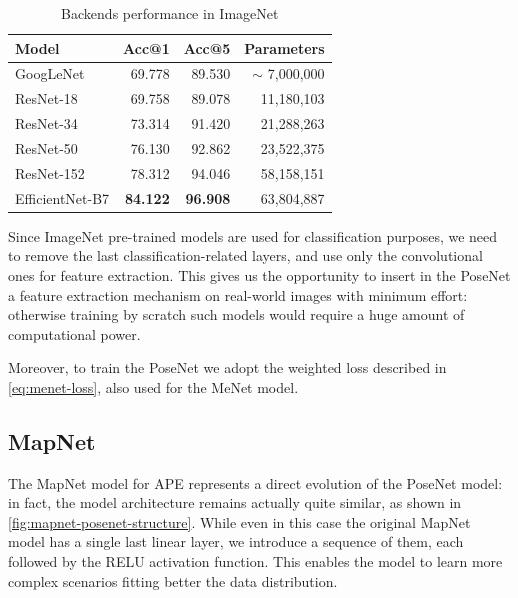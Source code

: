 \begin{table}[htbp]
    \caption{Backends performance in ImageNet}
    \begin{center}
        \begin{tabular}{lrrr}
            \toprule
            Model           & Acc@1           & Acc@5           & Parameters      \\
            \midrule
            GoogLeNet       & 69.778          & 89.530          & $\sim$ 7,000,000\\
            ResNet-18       & 69.758          & 89.078          & 11,180,103      \\
            ResNet-34       & 73.314          & 91.420          & 21,288,263      \\
            ResNet-50       & 76.130          & 92.862          & 23,522,375      \\
            ResNet-152      & 78.312          & 94.046          & 58,158,151      \\
            EfficientNet-B7 & \textbf{84.122} & \textbf{96.908} & 63,804,887      \\
            \bottomrule
        \end{tabular}
        \label{tab:backend-performance-imagenet}
    \end{center}
\end{table}

Since ImageNet pre-trained models are used for classification purposes, we need to remove the last classification-related layers, and use only the convolutional ones for feature extraction. This gives us the opportunity to insert in the PoseNet a feature extraction mechanism on real-world images with minimum effort: otherwise training by scratch such models would require a huge amount of computational power.

Moreover, to train the PoseNet we adopt the weighted loss described in \cref{eq:menet-loss}, also used for the MeNet model.

\subsection{MapNet}
The MapNet model for APE represents a direct evolution of the PoseNet model: in fact, the model architecture remains actually quite similar, as shown in \cref{fig:mapnet-posenet-structure}. While even in this case the original MapNet model has a single last linear layer, we introduce a sequence of them, each followed by the RELU activation function. This enables the model to learn more complex scenarios fitting better the data distribution.


